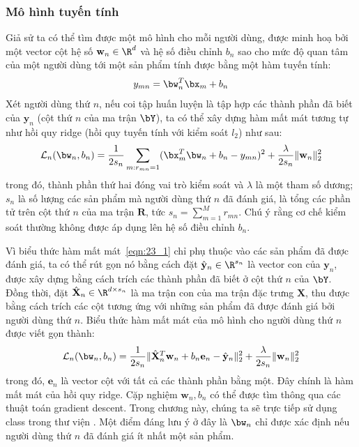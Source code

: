 \subsubsection{Mô hình tuyến tính} 
 
Giả sử ta có thể tìm được một mô hình cho mỗi người dùng, được minh hoạ
bởi một vector cột hệ số $\mathbf{w}_n \in \R^d$ và hệ số điều chỉnh $b_n$ sao cho
{mức độ quan tâm} của một người dùng tới một sản phẩm tính
được bằng một hàm tuyến tính:
\begin{equation} 
\label{eqn:23_1}
    y_{mn} = \bw_n^T\bx_m + b_n
\end{equation} 
Xét người dùng thứ $n$, nếu coi tập huấn luyện là tập hợp các
thành phần đã biết của $\mathbf{y}_n$ (cột thứ $n$ của ma
trận $\bY$), ta có thể xây dựng hàm mất
mát tương tự như hồi quy {ridge} (hồi quy tuyến tính với kiểm soát $l_2$) như sau:
\begin{equation} 
\label{eqn:23_1}
\mathcal{L}_n(\bw_n, b_n) = \frac{1}{2s_n} \sum_{m:r_{mn} = 1}(\bx_m^T\bw_n +
b_n
- y_{mn})^2
+ \frac{\lambda}{2s_n} \|\mathbf{w}_n\|_2^2
\end{equation} 
trong đó, thành phần thứ hai đóng vai trò kiểm soát và $\lambda$ là một tham số
dương; $s_n$ là số lượng các sản phẩm mà người dùng thứ $n$ đã đánh giá,
là tổng các phần tử trên cột thứ $n$ của ma trận $\mathbf{R}$, tức $s_n =
\sum_{m=1}^M r_{mn}$. Chú ý rằng cơ chế kiểm soát thường không được áp dụng lên
hệ số điều chỉnh $b_n$.
 

Vì biểu thức hàm mất mát~\eqref{eqn:23_1} chỉ phụ thuộc vào các sản phẩm đã
được đánh giá, ta có thể rút gọn nó bằng cách đặt $\hat{\mathbf{y}}_n \in
\R^{s_n}$ là
{vector con} của $\mathbf{y}_n$, được xây dựng bằng cách {trích}
các
thành phần đã biết ở cột thứ $n$ của $\bY$. Đồng thời, đặt
$\hat{\mathbf{X}}_n \in \R^{d\times s_n}$ là {ma trận con} của ma trận
đặc trưng $\mathbf{X}$, thu được bằng cách {trích} các cột tương ứng với
những sản phẩm đã được đánh giá bởi người dùng thứ $n$. Biểu thức hàm mất mát của mô hình cho người dùng thứ $n$ được viết gọn thành:
\begin{equation} 
    \mathcal{L}_n(\bw_n, b_n) = \frac{1}{2s_n}
    \|\hat{\mathbf{X}}_n^T\mathbf{w}_n + b_n
    \mathbf{e}_n- \hat{\mathbf{y}}_n\|_2^2 + \frac{\lambda}{2s_n} \|\mathbf{w}_n\|_2^2 
\end{equation} 
trong đó, $\mathbf{e}_n$ là vector cột với tất cả các thành phần bằng một. 
 Đây {chính} là hàm mất mát của hồi quy ridge. Cặp nghiệm
$\mathbf{w}_n, b_n$ có thể được tìm thông qua các thuật toán gradient
descent. Trong chương này, chúng ta sẽ trực tiếp sử dụng class
 trong thư viện . Một
điểm đáng lưu ý ở đây là $\bw_n$ chỉ được xác định nếu người dùng thứ $n$ đã
đánh giá ít nhất một sản phẩm.


